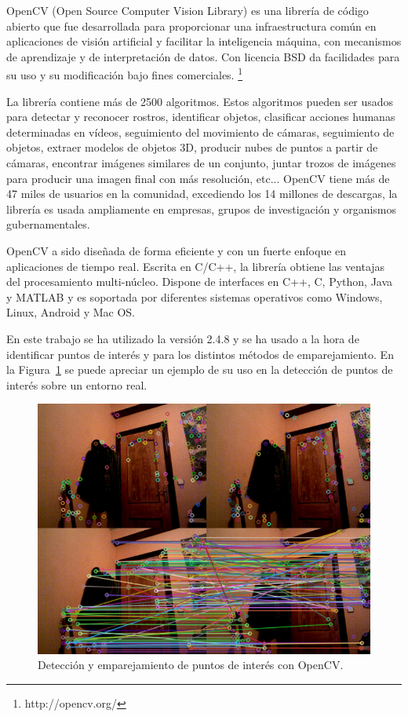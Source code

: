OpenCV (Open Source Computer Vision Library) es una librería de código abierto que fue desarrollada para proporcionar una infraestructura común en aplicaciones de visión artificial y facilitar la inteligencia máquina, con mecanismos de aprendizaje y de interpretación de datos. Con licencia BSD da facilidades para su uso y su modificación bajo fines comerciales. \footnote{http://opencv.org/}

La librería contiene más de 2500 algoritmos. Estos algoritmos pueden ser usados para detectar y reconocer rostros, identificar objetos, clasificar acciones humanas determinadas en vídeos, seguimiento del movimiento de cámaras, seguimiento de objetos, extraer modelos de objetos 3D, producir nubes de puntos a partir de cámaras, encontrar imágenes similares de un conjunto, juntar trozos de imágenes para producir una imagen final con más resolución, etc... OpenCV tiene más de 47 miles de usuarios en la comunidad, excediendo los 14 millones de descargas, la librería es usada ampliamente en empresas, grupos de investigación y organismos gubernamentales.

OpenCV a sido diseñada de forma eficiente y con un fuerte enfoque en aplicaciones de tiempo real. Escrita en C/C++, la librería obtiene las ventajas del procesamiento multi-núcleo. Dispone de interfaces en C++, C, Python, Java y MATLAB y es soportada por diferentes sistemas operativos como Windows, Linux, Android y Mac OS.

En este trabajo se ha utilizado la versión 2.4.8 y se ha usado a la hora de identificar puntos de interés y para los distintos métodos de emparejamiento. En la Figura~\ref{fig:SiftDetector2} se puede apreciar un ejemplo de su uso en la detección de puntos de interés sobre un entorno real.

\begin{figure}[th]
\centering
\includegraphics[scale=0.5]{Figures/sift-detector2.png}
\decoRule
\caption[Detección y emparejamiento con OpenCV]{Detección y emparejamiento de puntos de interés con OpenCV.}
\label{fig:SiftDetector2}
\end{figure}

